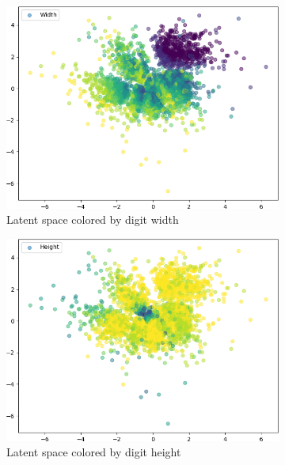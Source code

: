 \begin{figure}
\begin{subfigure}{.24\textwidth}
        \includegraphics[width=\textwidth]{images/latent_spaces/mnist/vae/embeddings_mu_4.png}
        \caption{Latent space colored by digit width}
        \label{subfig:vae_mnist_latent_space_width}
    \end{subfigure}
    \hfill
    \begin{subfigure}{.24\textwidth}
        \includegraphics[width=\textwidth]{images/latent_spaces/mnist/vae/embeddings_mu_5.png}
        \caption{Latent space colored by digit height}
        \label{subfig:vae_mnist_latent_space_height}
    \end{subfigure}
    \hfill
    \begin{subfigure}{.24\textwidth}

\end{subfigure}
\end{figure}
